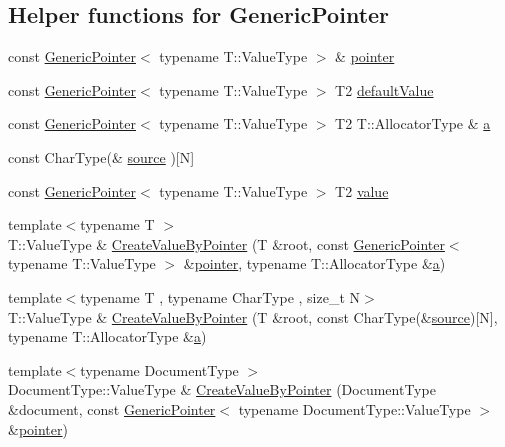 \subsection*{Helper functions for Generic\+Pointer}
\begin{DoxyCompactItemize}
\item 
const \mbox{\hyperlink{classrapidjson_1_1_generic_pointer}{Generic\+Pointer}}$<$ typename T\+::\+Value\+Type $>$ \& \mbox{\hyperlink{namespacerapidjson_aa5b8c07c8721afe6870a0210820ea19d}{pointer}}
\item 
const \mbox{\hyperlink{classrapidjson_1_1_generic_pointer}{Generic\+Pointer}}$<$ typename T\+::\+Value\+Type $>$ T2 \mbox{\hyperlink{namespacerapidjson_a1591a36fec4c563e57394458a2fc508d}{default\+Value}}
\item 
const \mbox{\hyperlink{classrapidjson_1_1_generic_pointer}{Generic\+Pointer}}$<$ typename T\+::\+Value\+Type $>$ T2 T\+::\+Allocator\+Type \& \mbox{\hyperlink{namespacerapidjson_a11fce64e721729aaf6be4a485c78f231}{a}}
\item 
const Char\+Type(\& \mbox{\hyperlink{namespacerapidjson_a37a3d95ab06aa7542487bb76e704885c}{source}} )\mbox{[}N\mbox{]}
\item 
const \mbox{\hyperlink{classrapidjson_1_1_generic_pointer}{Generic\+Pointer}}$<$ typename T\+::\+Value\+Type $>$ T2 \mbox{\hyperlink{namespacerapidjson_a1a75d60792094d496b500c40776030dd}{value}}
\item 
{\footnotesize template$<$typename T $>$ }\\T\+::\+Value\+Type \& \mbox{\hyperlink{namespacerapidjson_a6cc308180c1a10dc918da0192aed8fb7}{Create\+Value\+By\+Pointer}} (T \&root, const \mbox{\hyperlink{classrapidjson_1_1_generic_pointer}{Generic\+Pointer}}$<$ typename T\+::\+Value\+Type $>$ \&\mbox{\hyperlink{namespacerapidjson_aa5b8c07c8721afe6870a0210820ea19d}{pointer}}, typename T\+::\+Allocator\+Type \&\mbox{\hyperlink{namespacerapidjson_a11fce64e721729aaf6be4a485c78f231}{a}})
\item 
{\footnotesize template$<$typename T , typename Char\+Type , size\+\_\+t N$>$ }\\T\+::\+Value\+Type \& \mbox{\hyperlink{namespacerapidjson_abb3b041f41b39df3f4219803eb31947e}{Create\+Value\+By\+Pointer}} (T \&root, const Char\+Type(\&\mbox{\hyperlink{namespacerapidjson_a37a3d95ab06aa7542487bb76e704885c}{source}})\mbox{[}N\mbox{]}, typename T\+::\+Allocator\+Type \&\mbox{\hyperlink{namespacerapidjson_a11fce64e721729aaf6be4a485c78f231}{a}})
\item 
{\footnotesize template$<$typename Document\+Type $>$ }\\Document\+Type\+::\+Value\+Type \& \mbox{\hyperlink{namespacerapidjson_afea8374e37ec67d3d1f08eb8c109f40c}{Create\+Value\+By\+Pointer}} (Document\+Type \&document, const \mbox{\hyperlink{classrapidjson_1_1_generic_pointer}{Generic\+Pointer}}$<$ typename Document\+Type\+::\+Value\+Type $>$ \&\mbox{\hyperlink{namespacerapidjson_aa5b8c07c8721afe6870a0210820ea19d}{pointer}})

\end{DoxyCompactItemize}
